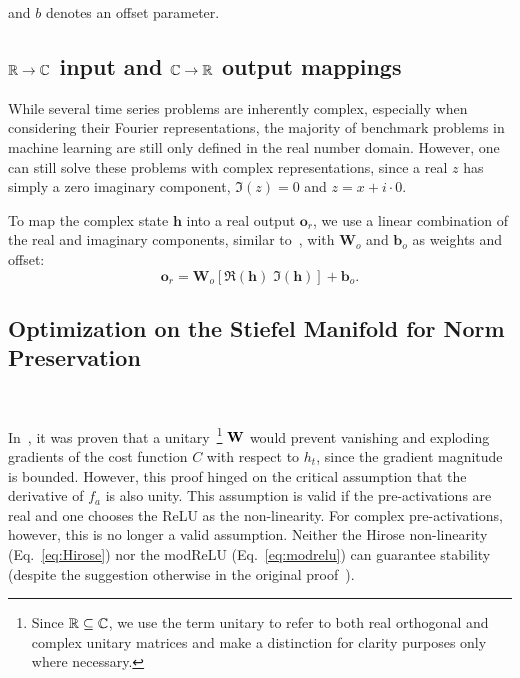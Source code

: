 \documentclass{article}
\begin{document}
and $b$ denotes an offset parameter.  %

\subsection{$\mathbb{R} \to \mathbb{C}$ input and $\mathbb{C} \to \mathbb{R}$ output mappings}
While several time series problems are inherently complex, especially when considering their Fourier representations, the majority of benchmark problems in machine learning are still only defined in the real number domain. However, one can still solve these problems with complex representations, since a real $z$ has simply a zero imaginary component, \ie $\Im{(z)} = 0$ and $z = x + i\cdot 0$.

To map the complex state $\bm{h}$ into a real output $\bm{o}_r$, we use a linear combination of the real and imaginary components, similar to~\cite{Arjovsky}, with $\bm{W}_o$ and $\bm{b}_o$ as weights and offset:
\begin{equation}
 \bm{o}_r = \mathbf{W}_o [\Re(\mathbf{h}) \; \Im(\mathbf{h})] + \mathbf{b}_o.
\end{equation}

\subsection{Optimization on the Stiefel Manifold for Norm Preservation}~\label{sec:stability}

In~\cite{Arjovsky}, it was proven that a unitary~\footnote{Since $\mathbb{R} \subseteq \mathbb{C}$, we use the term unitary to refer to both real orthogonal and complex unitary matrices and make a distinction for clarity purposes only where necessary.} $\mathbf{W}$ would prevent vanishing and exploding gradients of the cost function $C$ with respect to $h_t$, since the gradient magnitude is bounded.  However, this proof hinged on the critical assumption that the derivative of $f_a$ is also unity.  This assumption is valid if the pre-activations are real and one chooses the ReLU as the non-linearity.  For complex pre-activations, however, this is no longer a valid assumption. Neither the Hirose non-linearity (Eq.~\ref{eq:Hirose}) nor the modReLU (Eq.~\ref{eq:modrelu}) can guarantee stability (despite the suggestion otherwise in the original proof~\cite{Arjovsky}). %
\end{document}

